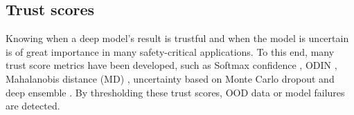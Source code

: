 \documentclass[journal]{IEEEtran}
\begin{document}
%

\subsection{Trust scores}
Knowing when a deep model's result is trustful and when the model is uncertain is of great importance in many safety-critical applications.
To this end, many trust score metrics have been developed, such as Softmax confidence \cite{hendrycks2016baseline}, ODIN \cite{liang2017enhancing}, Mahalanobis distance (MD) \cite{lee2018simple}, uncertainty \cite{malinin2019uncertainty} based on Monte Carlo dropout \cite{gal2016dropout} and deep ensemble \cite{lakshminarayanan2016simple}.
By thresholding these trust scores, OOD data \cite{hendrycks2016baseline} \cite{liang2017enhancing} \cite{lee2018simple} or model failures \cite{jiang2018trust}\cite{guo2017calibration} are detected.
\end{document}
